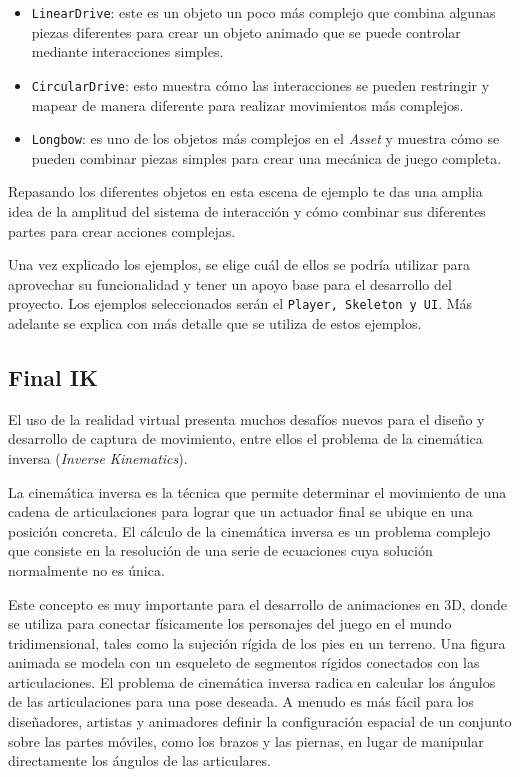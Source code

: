 \begin{itemize}
    \item \texttt{LinearDrive}: este es un objeto un poco más complejo que combina algunas piezas diferentes para crear un objeto animado que se puede controlar mediante interacciones simples.
    \item \texttt{CircularDrive}: esto muestra cómo las interacciones se pueden restringir y mapear de manera diferente para realizar movimientos más complejos.
    \item \texttt{Longbow}: es uno de los objetos más complejos en el \textit{Asset} y muestra cómo se pueden combinar piezas simples para crear una mecánica de juego completa. 
\end{itemize}

Repasando los diferentes objetos en esta escena de ejemplo te das una amplia idea de la amplitud del sistema de interacción y cómo combinar sus diferentes partes para crear acciones complejas.

Una vez explicado los ejemplos, se elige cuál de ellos se podría utilizar para aprovechar su funcionalidad y tener un apoyo base para el desarrollo del proyecto. Los ejemplos seleccionados serán el \texttt {Player, Skeleton y UI}. Más adelante se explica con más detalle que se utiliza de estos ejemplos.


\subsection{Final IK}

El uso de la realidad virtual presenta muchos desafíos nuevos para el diseño y desarrollo de captura de movimiento, entre ellos el problema de la cinemática inversa (\textit{Inverse Kinematics}). 

La cinemática inversa es la técnica que permite determinar el movimiento de una cadena de articulaciones para lograr que un actuador final se ubique en una posición concreta. El cálculo de la cinemática inversa es un problema complejo que consiste en la resolución de una serie de ecuaciones cuya solución normalmente no es única.\cite{CinematicaInversa}

Este concepto es muy importante para el desarrollo de animaciones en 3D, donde se utiliza para conectar físicamente los personajes del juego en el mundo tridimensional, tales como la sujeción rígida de los pies en un terreno. Una figura animada se modela con un esqueleto de segmentos rígidos conectados con las articulaciones. El problema de cinemática inversa radica en calcular los ángulos de las articulaciones para una pose deseada. A menudo es más fácil para los diseñadores, artistas y animadores definir la configuración espacial de un conjunto sobre las partes móviles, como los brazos y las piernas, en lugar de manipular directamente los ángulos de las articulares. 

